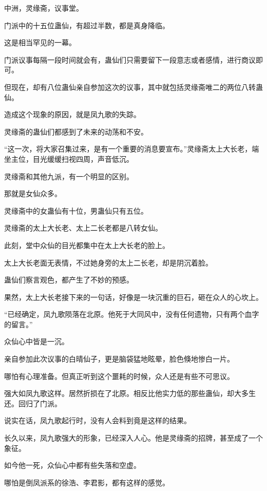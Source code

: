 
\begin{this_body}



中洲，灵缘斋，议事堂。

门派中的十五位蛊仙，有超过半数，都是真身降临。

这是相当罕见的一幕。

门派议事每隔一段时间就会有，蛊仙们只需要留下一段意志或者感情，进行商议即可。

但现在，却有八位蛊仙亲自参加这次的议事，其中就包括灵缘斋唯二的两位八转蛊仙。

造成这个现象的原因，就是凤九歌的失踪。

灵缘斋的蛊仙们都感到了未来的动荡和不安。

“这一次，将大家召集过来，是有一个重要的消息要宣布。”灵缘斋太上大长老，端坐主位，目光缓缓扫视四周，声音低沉。

灵缘斋和其他九派，有一个明显的区别。

那就是女仙众多。

灵缘斋中的女蛊仙有十位，男蛊仙只有五位。

灵缘斋的太上大长老、太上二长老都是八转女仙。

此刻，堂中众仙的目光都集中在太上大长老的脸上。

太上大长老面无表情，不过她身旁的太上二长老，却是阴沉着脸。

蛊仙们察言观色，都产生了不妙的预感。

果然，太上大长老接下来的一句话，好像是一块沉重的巨石，砸在众人的心坎上。

“已经确定，凤九歌陨落在北原。他死于大同风中，没有任何遗物，只有两个血字的留言。”

众仙心中皆是一沉。

亲自参加此次议事的白晴仙子，更是脑袋猛地眩晕，脸色倏地惨白一片。

哪怕有心理准备。但真正听到这个噩耗的时候，众人还是有些不可思议。

强大如凤九歌这样。居然折损在了北原。相反比他实力低的那些蛊仙，却大多生还。回归了门派。

说实在话，凤九歌起行时，没有人会料到竟是这样的结果。

长久以来，凤九歌强大的形象，已经深入人心。他是灵缘斋的招牌，甚至成了一个象征。

如今他一死，众仙心中都有些失落和空虚。

哪怕是倒凤派系的徐浩、李君影，都有这样的感觉。


\end{this_body}
